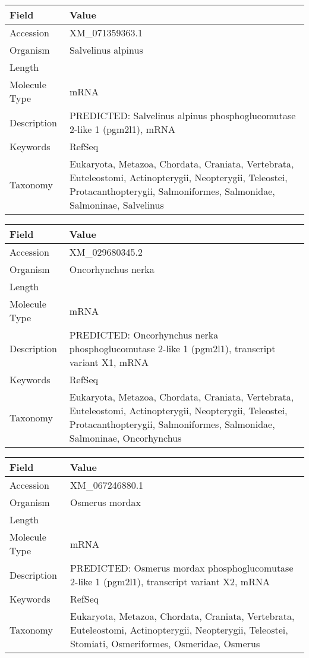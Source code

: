 \documentclass[10pt]{article}
\begin{document}
{\footnotesize
\begin{longtable}{>{\raggedright\arraybackslash}p{4.5cm} >{\raggedright\arraybackslash}p{11.5cm}}
\textbf{Field} & \textbf{Value} \\
\hline
Accession & XM\_071359363.1 \\
Organism & Salvelinus alpinus \\
Length & 4525 \\
Molecule Type & mRNA \\
Description & PREDICTED: Salvelinus alpinus phosphoglucomutase 2-like 1 (pgm2l1), mRNA \\
Keywords & RefSeq \\
Taxonomy & Eukaryota, Metazoa, Chordata, Craniata, Vertebrata, Euteleostomi, Actinopterygii, Neopterygii, Teleostei, Protacanthopterygii, Salmoniformes, Salmonidae, Salmoninae, Salvelinus \\
\end{longtable}
}

{\footnotesize
\begin{longtable}{>{\raggedright\arraybackslash}p{4.5cm} >{\raggedright\arraybackslash}p{11.5cm}}
\textbf{Field} & \textbf{Value} \\
\hline
Accession & XM\_029680345.2 \\
Organism & Oncorhynchus nerka \\
Length & 4469 \\
Molecule Type & mRNA \\
Description & PREDICTED: Oncorhynchus nerka phosphoglucomutase 2-like 1 (pgm2l1), transcript variant X1, mRNA \\
Keywords & RefSeq \\
Taxonomy & Eukaryota, Metazoa, Chordata, Craniata, Vertebrata, Euteleostomi, Actinopterygii, Neopterygii, Teleostei, Protacanthopterygii, Salmoniformes, Salmonidae, Salmoninae, Oncorhynchus \\
\end{longtable}
}

{\footnotesize
\begin{longtable}{>{\raggedright\arraybackslash}p{4.5cm} >{\raggedright\arraybackslash}p{11.5cm}}
\textbf{Field} & \textbf{Value} \\
\hline
Accession & XM\_067246880.1 \\
Organism & Osmerus mordax \\
Length & 3330 \\
Molecule Type & mRNA \\
Description & PREDICTED: Osmerus mordax phosphoglucomutase 2-like 1 (pgm2l1), transcript variant X2, mRNA \\
Keywords & RefSeq \\
Taxonomy & Eukaryota, Metazoa, Chordata, Craniata, Vertebrata, Euteleostomi, Actinopterygii, Neopterygii, Teleostei, Stomiati, Osmeriformes, Osmeridae, Osmerus \\
\end{longtable}
}
\end{document}
